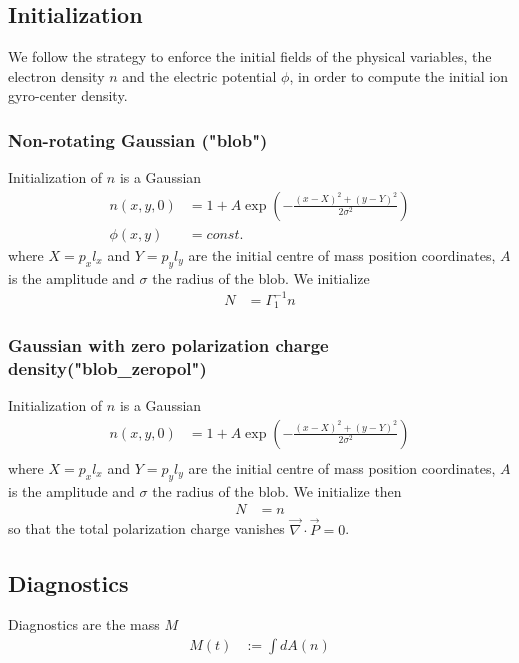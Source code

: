 \subsection{Initialization}
We follow the strategy to enforce the initial fields of the physical variables, 
the electron density \(n\) and the electric potential \(\phi\), in order to 
compute the initial ion gyro-center density.
\subsubsection{Non-rotating Gaussian ("blob")}
Initialization of $n$ is a Gaussian 
\begin{align}
    n(x,y,0) &= 1 + A\exp\left( -\frac{(x-X)^2 + (y-Y)^2}{2\sigma^2}\right) \\
    \phi(x,y)&=const.
\end{align}
where $X = p_x l_x$ and $Y=p_yl_y$ are the initial centre of mass position 
coordinates, $A$ is the amplitude and $\sigma$ the
radius of the blob.
We initialize 
\begin{align}
    N &= \Gamma_1^{-1} n 
\end{align}
\subsubsection{Gaussian with zero polarization charge density("blob\_zeropol")}
Initialization of $n$ is a Gaussian 
\begin{align}
    n(x,y,0) &= 1 + A\exp\left( -\frac{(x-X)^2 + (y-Y)^2}{2\sigma^2}\right) \\
\end{align}
where $X = p_x l_x$ and $Y=p_yl_y$ are the initial centre of mass position 
coordinates, $A$ is the amplitude and $\sigma$ the radius of the blob. We 
initialize then
\begin{align}
    N &= n 
\end{align}
so that the total polarization charge vanishes  \(\vec{\nabla}\cdot \vec{P}=0\).
\subsection{Diagnostics}
Diagnostics are the mass \(M\)
\begin{align}
    M(t) &:= \int dA (n)  \\
\end{align}
